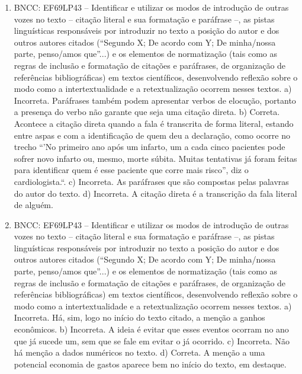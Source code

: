 \begin{enumerate}
\item
BNCC: EF69LP43 -- Identificar e utilizar os modos de introdução de
outras vozes no texto -- citação literal e sua formatação e paráfrase
--, as pistas linguísticas responsáveis por introduzir no texto a
posição do autor e dos outros autores citados (``Segundo X; De acordo
com Y; De minha/nossa parte, penso/amos que''...) e os elementos de
normatização (tais como as regras de inclusão e formatação de citações e
paráfrases, de organização de referências bibliográficas) em textos
científicos, desenvolvendo reflexão sobre o modo como a
intertextualidade e a retextualização ocorrem nesses textos.
 a) Incorreta. Paráfrases também podem apresentar verbos de elocução, portanto a presença do verbo não garante que seja uma citação direta. b) Correta. Acontece a citação direta quando a fala é transcrita de forma literal, estando entre aspas e com a identificação de quem deu a declaração, como ocorre no trecho ``'No primeiro ano após um infarto, um a cada cinco pacientes pode sofrer novo infarto ou, mesmo, morte súbita. Muitas tentativas já foram feitas para identificar quem é esse paciente que corre mais risco'', diz o cardiologista.``. c) Incorreta. As paráfrases que são compostas pelas palavras do autor do texto. d) Incorreta. A citação direta é a transcrição da fala literal de alguém.

\item
BNCC: EF69LP43 -- Identificar e utilizar os modos de introdução de
outras vozes no texto -- citação literal e sua formatação e paráfrase
--, as pistas linguísticas responsáveis por introduzir no texto a
posição do autor e dos outros autores citados (``Segundo X; De acordo
com Y; De minha/nossa parte, penso/amos que''...) e os elementos de
normatização (tais como as regras de inclusão e formatação de citações e
paráfrases, de organização de referências bibliográficas) em textos
científicos, desenvolvendo reflexão sobre o modo como a
intertextualidade e a retextualização ocorrem nesses textos.
 a) Incorreta. Há, sim, logo no início do texto citado, a menção a ganhos econômicos. b) Incorreta. A ideia é evitar que esses eventos ocorram no ano que já sucede um, sem que se fale em evitar o já ocorrido. c) Incorreta. Não há menção a dados numéricos no texto. d) Correta. A menção a uma potencial economia de gastos aparece bem no início do texto, em destaque.


\end{enumerate}
